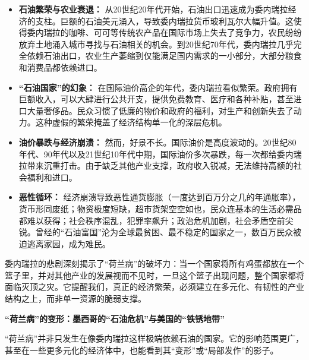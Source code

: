\begin{itemize}
    \item \textbf{石油繁荣与农业衰退：} 从20世纪20年代开始，石油出口迅速成为委内瑞拉经济的支柱。巨额的石油美元涌入，导致委内瑞拉货币玻利瓦尔大幅升值。这使得委内瑞拉的咖啡、可可等传统农产品在国际市场上失去了竞争力，农民纷纷放弃土地涌入城市寻找与石油相关的机会。到20世纪70年代，委内瑞拉几乎完全依赖石油出口，农业生产萎缩到仅能满足国内需求的一小部分，大部分粮食和消费品都依赖进口。
    \item \textbf{“石油国家”的幻象：} 在国际油价高企的年代，委内瑞拉看似繁荣。政府拥有巨额收入，可以大肆进行公共开支，提供免费教育、医疗和各种补贴，甚至进口大量奢侈品。民众习惯了低廉的物价和政府的福利，对生产和创新失去了动力。这种虚假的繁荣掩盖了经济结构单一化的深层危机。
    \item \textbf{油价暴跌与经济崩溃：} 然而，好景不长。国际油价是高度波动的。20世纪80年代、90年代以及21世纪10年代中期，国际油价多次暴跌，每一次都给委内瑞拉带来沉重打击。由于缺乏其他产业支撑，政府收入锐减，无法维持高额的社会福利和进口。
    \item \textbf{恶性循环：} 经济崩溃导致恶性通货膨胀（一度达到百万分之几的年通胀率），货币形同废纸；物资极度短缺，超市货架空空如也，民众连基本的生活必需品都难以获得；社会秩序混乱，犯罪率飙升；政治危机加剧，社会矛盾空前尖锐。曾经的“石油富国”沦为全球最贫困、最不稳定的国家之一，数百万民众被迫逃离家园，成为难民。
\end{itemize}

委内瑞拉的悲剧深刻揭示了“荷兰病”的破坏力：当一个国家将所有鸡蛋都放在一个篮子里，并对其他产业的发展视而不见时，一旦这个篮子出现问题，整个国家都将面临灭顶之灾。它提醒我们，真正的经济繁荣，必须建立在多元化、有韧性的产业结构之上，而非单一资源的脆弱支撑。

\textbf{“荷兰病”的变形：墨西哥的“石油危机”与美国的“铁锈地带”}

“荷兰病”并非只发生在像委内瑞拉这样极端依赖石油的国家。它的影响范围更广，甚至在一些更多元化的经济体中，也能看到其“变形”或“局部发作”的影子。


